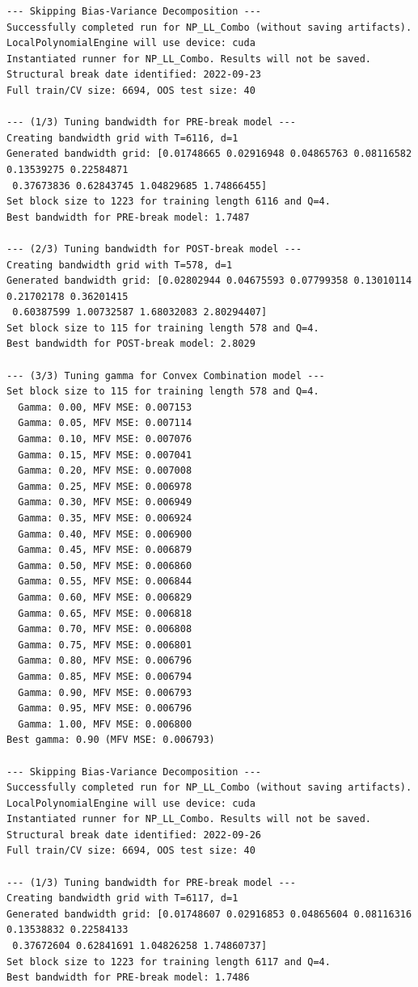 \documentclass[
  letterpaper,
  DIV=11,
  numbers=noendperiod]{scrartcl}
\begin{document}
\begin{verbatim}
--- Skipping Bias-Variance Decomposition ---
Successfully completed run for NP_LL_Combo (without saving artifacts).
LocalPolynomialEngine will use device: cuda
Instantiated runner for NP_LL_Combo. Results will not be saved.
Structural break date identified: 2022-09-23
Full train/CV size: 6694, OOS test size: 40

--- (1/3) Tuning bandwidth for PRE-break model ---
Creating bandwidth grid with T=6116, d=1
Generated bandwidth grid: [0.01748665 0.02916948 0.04865763 0.08116582 0.13539275 0.22584871
 0.37673836 0.62843745 1.04829685 1.74866455]
Set block size to 1223 for training length 6116 and Q=4.
Best bandwidth for PRE-break model: 1.7487

--- (2/3) Tuning bandwidth for POST-break model ---
Creating bandwidth grid with T=578, d=1
Generated bandwidth grid: [0.02802944 0.04675593 0.07799358 0.13010114 0.21702178 0.36201415
 0.60387599 1.00732587 1.68032083 2.80294407]
Set block size to 115 for training length 578 and Q=4.
Best bandwidth for POST-break model: 2.8029

--- (3/3) Tuning gamma for Convex Combination model ---
Set block size to 115 for training length 578 and Q=4.
  Gamma: 0.00, MFV MSE: 0.007153
  Gamma: 0.05, MFV MSE: 0.007114
  Gamma: 0.10, MFV MSE: 0.007076
  Gamma: 0.15, MFV MSE: 0.007041
  Gamma: 0.20, MFV MSE: 0.007008
  Gamma: 0.25, MFV MSE: 0.006978
  Gamma: 0.30, MFV MSE: 0.006949
  Gamma: 0.35, MFV MSE: 0.006924
  Gamma: 0.40, MFV MSE: 0.006900
  Gamma: 0.45, MFV MSE: 0.006879
  Gamma: 0.50, MFV MSE: 0.006860
  Gamma: 0.55, MFV MSE: 0.006844
  Gamma: 0.60, MFV MSE: 0.006829
  Gamma: 0.65, MFV MSE: 0.006818
  Gamma: 0.70, MFV MSE: 0.006808
  Gamma: 0.75, MFV MSE: 0.006801
  Gamma: 0.80, MFV MSE: 0.006796
  Gamma: 0.85, MFV MSE: 0.006794
  Gamma: 0.90, MFV MSE: 0.006793
  Gamma: 0.95, MFV MSE: 0.006796
  Gamma: 1.00, MFV MSE: 0.006800
Best gamma: 0.90 (MFV MSE: 0.006793)

--- Skipping Bias-Variance Decomposition ---
Successfully completed run for NP_LL_Combo (without saving artifacts).
LocalPolynomialEngine will use device: cuda
Instantiated runner for NP_LL_Combo. Results will not be saved.
Structural break date identified: 2022-09-26
Full train/CV size: 6694, OOS test size: 40

--- (1/3) Tuning bandwidth for PRE-break model ---
Creating bandwidth grid with T=6117, d=1
Generated bandwidth grid: [0.01748607 0.02916853 0.04865604 0.08116316 0.13538832 0.22584133
 0.37672604 0.62841691 1.04826258 1.74860737]
Set block size to 1223 for training length 6117 and Q=4.
Best bandwidth for PRE-break model: 1.7486


\end{verbatim}
\end{document}

